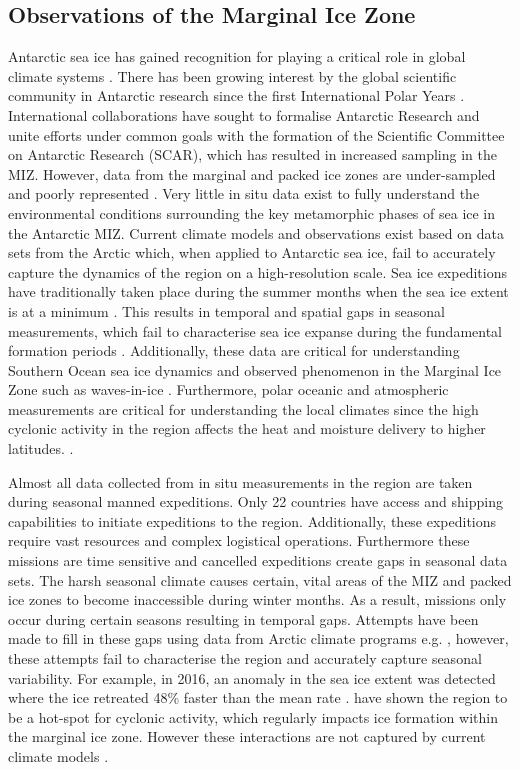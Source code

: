 \subsection{Observations of the Marginal Ice Zone}
Antarctic sea ice has gained recognition for playing a critical role in global climate systems \cite{kennicutt2016delivering}. There has been growing interest by the global scientific community in Antarctic research since the first International Polar Years \cite{kennicutt2016delivering}. International collaborations have sought to formalise Antarctic Research and unite efforts under common goals \cite{kennicutt2016delivering} with the formation of the Scientific Committee on Antarctic Research (SCAR), which has resulted in increased sampling in the MIZ. However, data from the marginal and packed ice zones are under-sampled and poorly represented \cite{vichi2019effects}. Very little in situ data exist to fully understand the environmental conditions surrounding the key metamorphic phases of sea ice in the Antarctic MIZ. Current climate models and observations exist based on data sets from the Arctic \cite{vichi2019effects} which, when applied to Antarctic sea ice, fail to accurately capture the dynamics of the region on a high-resolution scale. Sea ice expeditions have traditionally taken place during the summer months when the sea ice extent is at a minimum \cite{kennicutt2016delivering}. This results in temporal and spatial gaps in seasonal measurements, which fail to characterise sea ice expanse during the fundamental formation periods \cite{MAKSYM2012seaiceextent}. Additionally, these data are critical for understanding Southern Ocean sea ice dynamics and observed phenomenon in the Marginal Ice Zone such as waves-in-ice \cite{kohout2014storm}. Furthermore, polar oceanic and atmospheric measurements are critical for understanding the local climates since the high cyclonic activity in the region affects the heat and moisture delivery to higher latitudes. \cite{vichi2019effects}.

Almost all data collected from in situ measurements in the region are taken during seasonal manned expeditions. Only 22 countries have access and shipping capabilities to initiate expeditions to the region. Additionally, these expeditions require vast resources and complex logistical operations. Furthermore these missions are time sensitive and cancelled expeditions create gaps in seasonal data sets. The harsh seasonal climate causes certain, vital areas of the MIZ and packed ice zones to become inaccessible during winter months. As a result, missions only occur during certain seasons resulting in temporal gaps. Attempts have been made to fill in these gaps using data from Arctic climate programs e.g. \textcite{lee2012program}, however, these attempts fail to characterise the region and accurately capture seasonal variability. For example, in 2016, an anomaly in the sea ice extent was detected where the ice retreated 48\% faster than the mean rate \cite{turner2017unprecedented}. \textcite{vichi2019effects} have shown the region to be a hot-spot for cyclonic activity, which regularly impacts ice formation within the marginal ice zone. However these interactions are not captured by current climate models \cite{vichi2019effects}.\par


